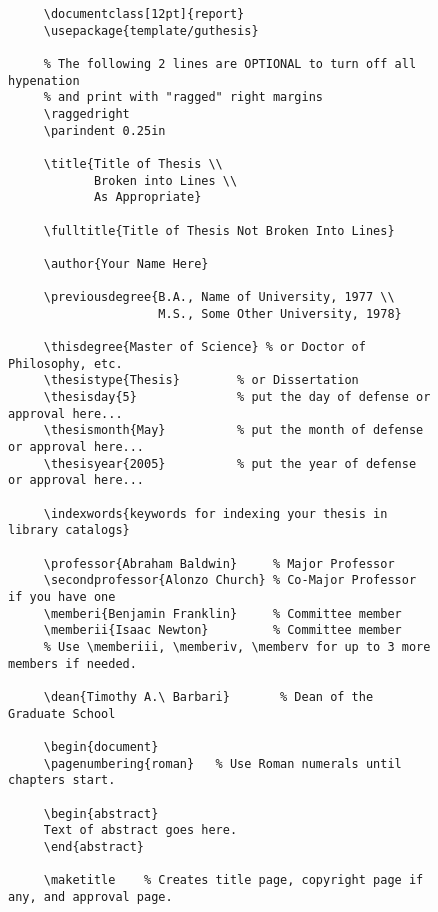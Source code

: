 \documentclass[12pt]{report}
\begin{document}
\begin{figure}
\begin{center}
\begin{minipage}{5in}
\tiny
\begin{verbatim}
     \documentclass[12pt]{report}
     \usepackage{template/guthesis}

     % The following 2 lines are OPTIONAL to turn off all hypenation
     % and print with "ragged" right margins
     \raggedright
     \parindent 0.25in

     \title{Title of Thesis \\
            Broken into Lines \\
            As Appropriate}

     \fulltitle{Title of Thesis Not Broken Into Lines}

     \author{Your Name Here}

     \previousdegree{B.A., Name of University, 1977 \\
                     M.S., Some Other University, 1978}

     \thisdegree{Master of Science} % or Doctor of Philosophy, etc.
     \thesistype{Thesis}        % or Dissertation
     \thesisday{5}              % put the day of defense or approval here...
     \thesismonth{May}          % put the month of defense or approval here...
     \thesisyear{2005}          % put the year of defense or approval here...

     \indexwords{keywords for indexing your thesis in library catalogs}

     \professor{Abraham Baldwin}     % Major Professor
     \secondprofessor{Alonzo Church} % Co-Major Professor if you have one
     \memberi{Benjamin Franklin}     % Committee member
     \memberii{Isaac Newton}         % Committee member
     % Use \memberiii, \memberiv, \memberv for up to 3 more members if needed.

     \dean{Timothy A.\ Barbari}       % Dean of the Graduate School

     \begin{document}
     \pagenumbering{roman}   % Use Roman numerals until chapters start.

     \begin{abstract}
     Text of abstract goes here.
     \end{abstract}

     \maketitle    % Creates title page, copyright page if any, and approval page.


\end{verbatim}
\end{minipage}
\end{center}
\end{figure}
\end{document}
